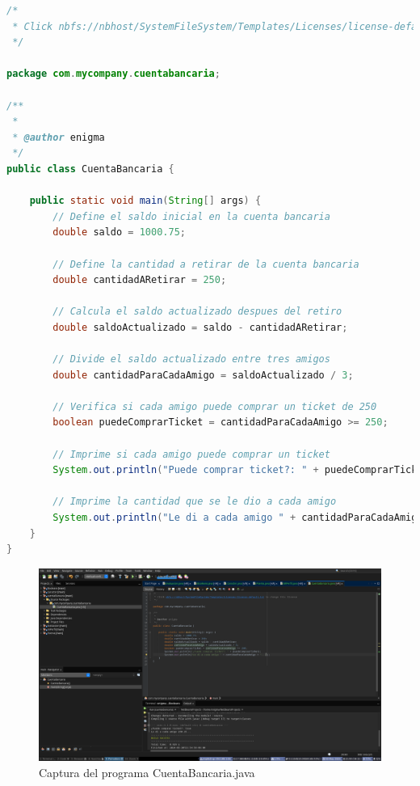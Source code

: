 \documentclass{article}
\begin{document}
\begin{lstlisting}[language=Java, caption={Código del programa CuentaBancaria.java}]
/*
 * Click nbfs://nbhost/SystemFileSystem/Templates/Licenses/license-default.txt to change this license
 */

package com.mycompany.cuentabancaria;

/**
 *
 * @author enigma
 */
public class CuentaBancaria {

    public static void main(String[] args) {
        // Define el saldo inicial en la cuenta bancaria
        double saldo = 1000.75;

        // Define la cantidad a retirar de la cuenta bancaria
        double cantidadARetirar = 250;

        // Calcula el saldo actualizado despues del retiro
        double saldoActualizado = saldo - cantidadARetirar;

        // Divide el saldo actualizado entre tres amigos
        double cantidadParaCadaAmigo = saldoActualizado / 3;

        // Verifica si cada amigo puede comprar un ticket de 250
        boolean puedeComprarTicket = cantidadParaCadaAmigo >= 250;

        // Imprime si cada amigo puede comprar un ticket
        System.out.println("Puede comprar ticket?: " + puedeComprarTicket);

        // Imprime la cantidad que se le dio a cada amigo
        System.out.println("Le di a cada amigo " + cantidadParaCadaAmigo + "...");
    }
}


\end{lstlisting}

\newpage

\begin{landscape}
    \begin{figure}[h]
        \centering
        \includegraphics[width=\linewidth]{img/cuentaBancaria.png}
        \caption{Captura del programa CuentaBancaria.java}
        \label{fig:captura}
    \end{figure}
\end{landscape}
\end{document}
